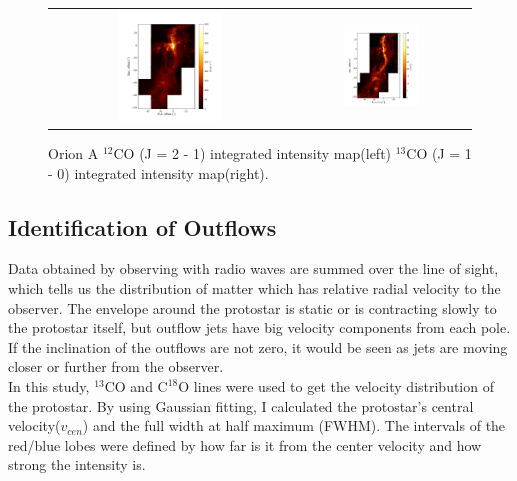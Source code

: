 \begin{figure}[t]
	\begin{center}
		\begin{tabular}{cc}
			\includegraphics[width=0.45\textwidth]{RNE_12CO_Orion} & \includegraphics[width=0.45\textwidth]{Orion_13CO_intmap}
		\end{tabular}
	\end{center}
	\caption{Orion A $^{12}$CO (J = 2 - 1) integrated intensity map(left) $^{13}$CO (J = 1 - 0) integrated intensity map(right).}
	\label{fig:map1}  %
\end{figure}

\subsection{Identification of Outflows}
Data obtained by observing with radio waves are summed over the line of sight, which tells us the distribution of matter which has relative radial velocity to the observer. The envelope around the protostar is static or is contracting slowly to the protostar itself, but outflow jets have big velocity components from each pole. If the inclination of the outflows are not zero, it would be seen as jets are moving closer or further from the observer. \\
In this study, $^{13}$CO and $\textrm{C}^{18}\textrm{O}$ lines were used to get the velocity distribution of the protostar. By using Gaussian fitting, I calculated the protostar’s central velocity($v_{cen}$) and the full width at half maximum (FWHM). The intervals of the red/blue lobes were defined by how far is it from the center velocity and how strong the intensity is.

